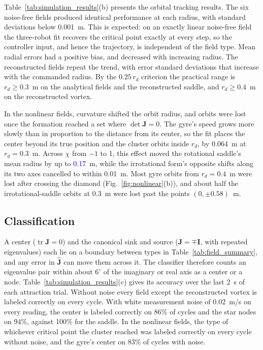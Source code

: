\documentclass[lettersize,journal]{IEEEtran}
\newcommand{\rev}[1]{#1}
\newcommand{\newnum}[1]{\textcolor{blue}{#1}}
\begin{document}
    Table~\ref{tab:simulation_results}(b) presents the orbital tracking results. The six noise-free fields produced identical performance at each radius, with standard deviations below \rev{0.001}~m. This is expected: on an exactly linear noise-free field the three-robot fit recovers the critical point exactly at every step, so the controller input, and hence the trajectory, is independent of the field type. Mean radial errors had a positive bias, and decreased with increasing radius. The reconstructed fields repeat the trend, with error standard deviations that increase with the commanded radius. By the $0.25\,r_d$ criterion the practical range is $r_d \ge \rev{0.3}$~m on the analytical fields and the reconstructed saddle, and $r_d \ge \rev{0.4}$~m on the reconstructed vortex.

In the nonlinear fields, curvature shifted the orbit radius, and orbits were lost once the formation reached a set where $\det\mathbf{J} = 0$. The gyre's speed grows more slowly than in proportion to the distance from its center, so the fit places the center beyond its true position and the cluster orbits inside $r_d$, by \rev{0.064}~m at $r_d = 0.3$~m. Across $\chi$ from $-1$ to 1, this effect moved the rotational saddle's mean radius by up to \newnum{0.17}~m, while the irrotational form's opposite shifts along its two axes cancelled to within \rev{0.01}~m. Most gyre orbits from $r_d = 0.4$~m were lost after crossing the diamond (Fig.~\ref{fig:nonlinear}(b)), and about half the irrotational-saddle orbits at 0.3~m were lost past the points $(0, \pm 0.58)$~m.

\subsection{Classification}

A center ($\operatorname{tr}\mathbf{J} = 0$) and the canonical sink and source ($\mathbf{J} = \mp\mathbf{I}$, with repeated eigenvalues) each lie on a boundary between types in Table~\ref{tab:field_summary}, and any error in $\hat{\mathbf{J}}$ can move them across it. The classifier therefore counts an eigenvalue pair within about $6^\circ$ of the imaginary or real axis as a center or a node. Table~\ref{tab:simulation_results}(c) gives its accuracy over the last 2~s of each attraction trial. Without noise every field except the reconstructed vortex is labeled correctly on every cycle. With white measurement noise of 0.02~m/s on every reading, the center is labeled correctly on \rev{86}\% of cycles and the star nodes on \rev{94}\%, against \rev{100}\% for the saddle. In the nonlinear fields, the type of whichever critical point the cluster reached was labeled correctly on every cycle without noise, and the gyre's center on \rev{83}\% of cycles with noise.
\end{document}
